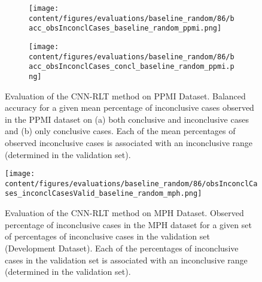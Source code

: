 \begin{figure}[t]
\begin{subfigure}{0.9\textwidth}
  \centering
  \texttt{[image: content/figures/evaluations/baseline\_random/86/bacc\_obsInconclCases\_baseline\_random\_ppmi.png]}
  \subcaption{}
  \label{fig:bacc_obsInconclCases_baseline_random_ppmi}
\end{subfigure}
\hfill
\begin{subfigure}{0.9\textwidth}
  \centering
  \texttt{[image: content/figures/evaluations/baseline\_random/86/bacc\_obsInconclCases\_concl\_baseline\_random\_ppmi.png]}
  \subcaption{}
  \label{fig:bacc_obsInconclCases_concl_baseline_random_ppmi}
\end{subfigure}

\caption{Evaluation of the CNN-RLT method on PPMI Dataset.
Balanced accuracy for a given mean percentage of inconclusive cases observed in the PPMI dataset on 
(a) both conclusive and inconclusive cases and (b) only conclusive cases. 
Each of the mean percentages of observed inconclusive cases is associated 
with an inconclusive range (determined in the validation set). }
\label{fig:bacc_obsInconclCases_baseline_random_ppmi_full}
\end{figure}





\begin{figure}[h]
\centering
\texttt{[image: content/figures/evaluations/baseline\_random/86/obsInconclCases\_inconclCasesValid\_baseline\_random\_mph.png]}
\caption{Evaluation of the CNN-RLT method on MPH Dataset.
Observed percentage of inconclusive cases in the MPH dataset 
for a given set of percentages of inconclusive cases in the validation set (Development Dataset).
Each of the percentages of inconclusive cases in the validation set is associated 
with an inconclusive range (determined in the validation set).} 
\label{fig:obsInconclCases_inconclCasesValid_baseline_random_mph}
\end{figure} 


